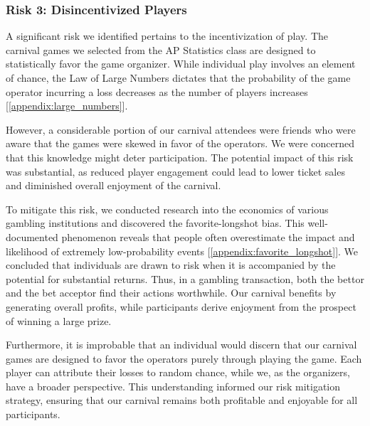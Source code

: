 \subsubsection{Risk 3: Disincentivized Players}

A significant risk we identified pertains to the incentivization of play. The carnival games we selected from the AP Statistics class are designed to statistically favor the game organizer. While individual play involves an element of chance, the Law of Large Numbers dictates that the probability of the game operator incurring a loss decreases as the number of players increases [\ref{appendix:large_numbers}].

However, a considerable portion of our carnival attendees were friends who were aware that the games were skewed in favor of the operators. We were concerned that this knowledge might deter participation. The potential impact of this risk was substantial, as reduced player engagement could lead to lower ticket sales and diminished overall enjoyment of the carnival.

To mitigate this risk, we conducted research into the economics of various gambling institutions and discovered the favorite-longshot bias. This well-documented phenomenon reveals that people often overestimate the impact and likelihood of extremely low-probability events [\ref{appendix:favorite_longshot}]. We concluded that individuals are drawn to risk when it is accompanied by the potential for substantial returns. Thus, in a gambling transaction, both the bettor and the bet acceptor find their actions worthwhile. Our carnival benefits by generating overall profits, while participants derive enjoyment from the prospect of winning a large prize.

Furthermore, it is improbable that an individual would discern that our carnival games are designed to favor the operators purely through playing the game. Each player can attribute their losses to random chance, while we, as the organizers, have a broader perspective. This understanding informed our risk mitigation strategy, ensuring that our carnival remains both profitable and enjoyable for all participants.
